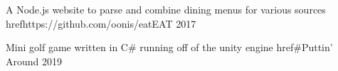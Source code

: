 
\begin{cventries}
    \cventry
    {A Node.js website to parse and combine dining menus for various sources}
    {href{https://github.com/oonis/eat}{EAT}}
    {}
    {2017}
    {
    }

    \cventry
    {Mini golf game written in C# running off of the unity engine}
    {href{#}{Puttin' Around}} %
    {}
    {2019}
    {
    }
\end{cventries}
